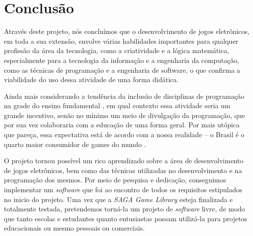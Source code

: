 \chapter{Conclusão}
\label{conclusao}
%
Através deste projeto, nós concluímos que o desenvolvimento de jogos eletrônicos, em toda a sua extensão, envolve várias habilidades importantes para qualquer profissão da área da tecnologia, como a criatividade e a lógica matemática, especialmente para a tecnologia da informação e a engenharia da computação, como as técnicas de programação e a engenharia de software, o que confirma a viabilidade do uso dessa atividade de uma forma didática.

Ainda mais considerando a tendência da inclusão de disciplinas de programação na grade do ensino fundamental \nocite{OLHARDIG}, em qual contexto essa atividade seria um grande incentivo, senão no mínimo um meio de divulgação da programação, que por sua vez colaboraria com a educação de uma forma geral. Por mais utópica que pareça, essa expectativa está de acordo com a nossa realidade -- o Brasil é o quarto maior consumidor de games do mundo \nocite{ESTADAO}. 
\par 
O projeto tornou possível um rico aprendizado sobre a área de desenvolvimento de jogos eletrônicos, bem como das técnicas utilizadas no desenvolvimento e na programação dos mesmos. Por meio de pesquisa e dedicação, conseguimos implementar um \textit{software} que foi ao encontro de todos os requisitos estipulados no inicio do projeto. Uma vez que a \textit{SAGA Game Library} esteja finalizada e totalmente testada, pretendemos torná-la um projeto de \textit{software} livre, de modo que tanto escolas e estudantes quanto entusiastas possam utilizá-la para projetos educacionais ou mesmo pessoais ou comerciais.